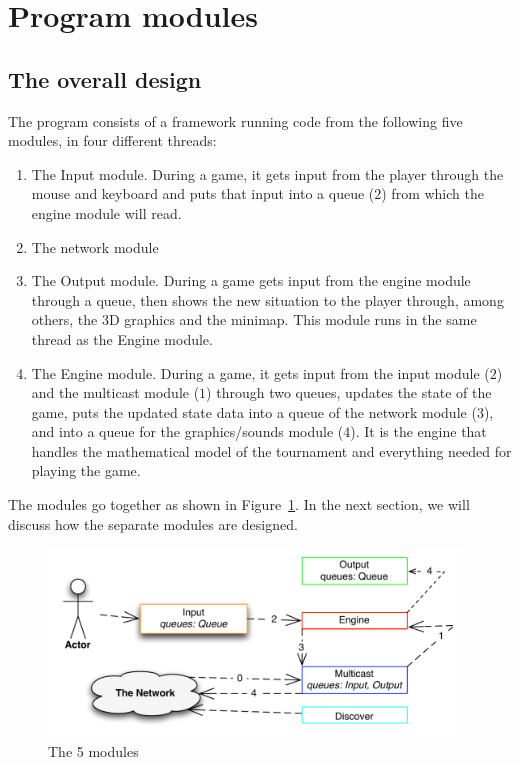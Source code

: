     \section{Program modules} %
    \label{sec:program_modules}

      \subsection{The overall design} %
      \label{sub:design}
        The program consists of a framework running code from the following five modules, in four different threads:

        \begin{enumerate}
          \item The Input module. During a game, it gets input from the player through the mouse and keyboard and puts that input into a queue ($2$) from which the engine module will read.

          \item The network module

          \item The Output module. During a game gets input from the engine module through a queue, then shows the new situation to the player through, among others, the 3D graphics and the minimap. This module runs in the same thread as the Engine module.
          \item The Engine module. During a game, it gets input from the input module ($2$) and the multicast module ($1$) through two queues, updates the state of the game, puts the updated state data into a queue of the network module ($3$), and into a queue for the graphics/sounds module ($4$). It is the engine that handles the mathematical model of the tournament and everything needed for playing the game.
        \end{enumerate}

        The modules go together as shown in Figure~\ref{fig:modules}. In the next section, we will discuss how the separate modules are designed.\\

        \begin{figure}[!ht]
          \centering
          \includegraphics[width=11cm,height=5cm]{diagrams/modules}
          \caption{The 5 modules} \label{fig:modules}
        \end{figure}

